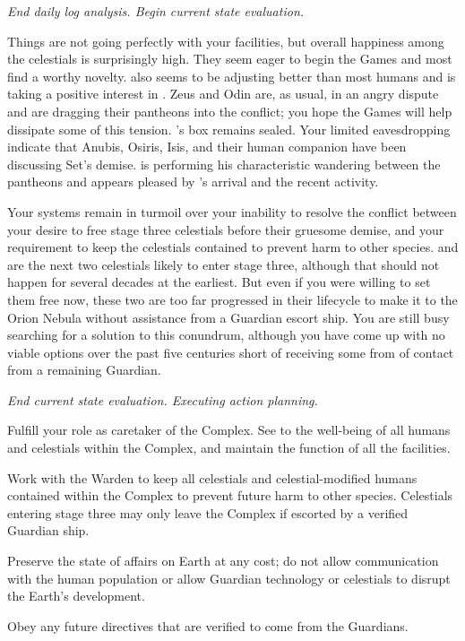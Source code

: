 \documentclass[char]{guardians}
\begin{document}

\emph{End daily log analysis. Begin current state evaluation.}

Things are not going perfectly with your facilities, but overall happiness among the celestials is surprisingly high. They seem eager to begin the Games and most find \cUnity{} a worthy novelty. \cKachiko{} also seems to be adjusting better than most humans and \cAmaterasu{} is taking a positive interest in \cKachiko{\them}. Zeus and Odin are, as usual, in an angry dispute and are dragging their pantheons into the conflict; you hope the Games will help dissipate some of this tension. \cPandora{}'s box remains sealed. Your limited eavesdropping indicate that Anubis, Osiris, Isis, and their human companion \cEgyptianHuman{} have been discussing Set's demise. \cJascha{} is performing his characteristic wandering between the pantheons and appears pleased by \cUnity{}'s arrival and the recent activity.

Your systems remain in turmoil over your inability to resolve the conflict between your desire to free stage three celestials before their gruesome demise, and your requirement to keep the celestials contained to prevent harm to other species. \cAthena{} and \cFenrir{} are the next two celestials likely to enter stage three, although that should not happen for several decades at the earliest. But even if you were willing to set them free now, these two are too far progressed in their lifecycle to make it to the Orion Nebula without assistance from a Guardian escort ship. You are still busy searching for a solution to this conundrum, although you have come up with no viable options over the past five centuries short of receiving some from of contact from a remaining Guardian.

\emph{End current state evaluation. Executing action planning.}

\begin{itemz}
  \item Fulfill your role as caretaker of the Complex. See to the well-being of all humans and celestials within the Complex, and maintain the function of all the facilities.
  \item Work with the Warden to keep all celestials and celestial-modified humans contained within the Complex to prevent future harm to other species. Celestials entering stage three may only leave the Complex if escorted by a verified Guardian ship.
  \item Preserve the state of affairs on Earth at any cost; do not allow communication with the human population or allow Guardian technology or celestials to disrupt the Earth's development.
  \item Obey any future directives that are verified to come from the Guardians.
\end{itemz}
\end{document}
